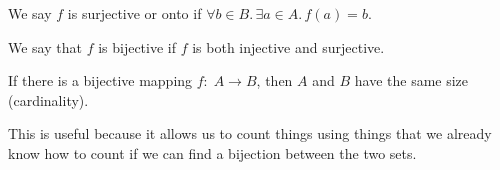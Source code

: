 \begin{definition}[Surjective]
   We say $f$ is surjective or onto if $\forall b \in B.\, \exists a \in A.\, f(a) = b$.
\end{definition}

\begin{definition}[Bijection]
   We say that $f$ is bijective if $f$ is both injective and surjective.
\end{definition}

\begin{remark}
   If there is a bijective mapping $f:\; A \to B$, then $A$ and $B$ have the same size (cardinality).
\end{remark}

This is useful because it allows us to count things using things that we already know how to count if we can find a bijection between the two sets.

